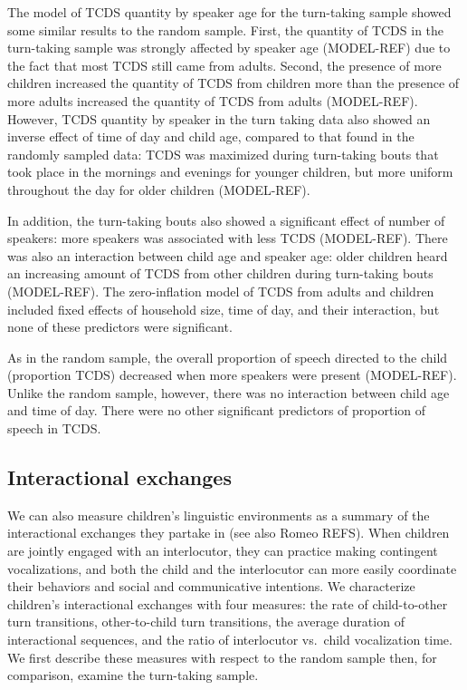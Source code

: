 \documentclass[floatsintext,man]{apa6}
\theoremstyle{definition}
\theoremstyle{definition}
\theoremstyle{definition}
\theoremstyle{remark}
\begin{document}
The model of TCDS quantity by speaker age for the turn-taking sample
showed some similar results to the random sample. First, the quantity of
TCDS in the turn-taking sample was strongly affected by speaker age
(MODEL-REF) due to the fact that most TCDS still came from adults.
Second, the presence of more children increased the quantity of TCDS
from children more than the presence of more adults increased the
quantity of TCDS from adults (MODEL-REF). However, TCDS quantity by
speaker in the turn taking data also showed an inverse effect of time of
day and child age, compared to that found in the randomly sampled data:
TCDS was maximized during turn-taking bouts that took place in the
mornings and evenings for younger children, but more uniform throughout
the day for older children (MODEL-REF).

In addition, the turn-taking bouts also showed a significant effect of
number of speakers: more speakers was associated with less TCDS
(MODEL-REF). There was also an interaction between child age and speaker
age: older children heard an increasing amount of TCDS from other
children during turn-taking bouts (MODEL-REF). The zero-inflation model
of TCDS from adults and children included fixed effects of household
size, time of day, and their interaction, but none of these predictors
were significant.

As in the random sample, the overall proportion of speech directed to
the child (proportion TCDS) decreased when more speakers were present
(MODEL-REF). Unlike the random sample, however, there was no interaction
between child age and time of day. There were no other significant
predictors of proportion of speech in TCDS.

\subsection{Interactional exchanges}\label{interactional-exchanges}

We can also measure children's linguistic environments as a summary of
the interactional exchanges they partake in (see also Romeo REFS). When
children are jointly engaged with an interlocutor, they can practice
making contingent vocalizations, and both the child and the interlocutor
can more easily coordinate their behaviors and social and communicative
intentions. We characterize children's interactional exchanges with four
measures: the rate of child-to-other turn transitions, other-to-child
turn transitions, the average duration of interactional sequences, and
the ratio of interlocutor vs.~child vocalization time. We first describe
these measures with respect to the random sample then, for comparison,
examine the turn-taking sample.
\end{document}
